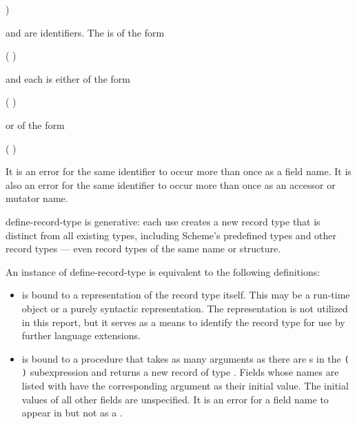 \begin{entry}{%
)}

\syntax
{} and  are identifiers.
The  is of the form
\begin{scheme}
(  \dotsfoo)%
\end{scheme}
and each  is either of the form
\begin{scheme}
( )%
\end{scheme}
or of the form
\begin{scheme}
(  )%
\end{scheme}

It is an error for the same identifier to occur more than once as a
field name.
It is also an error for the same identifier to occur more than once
as an accessor or mutator name.

{\cf define-record-type} is generative: each use creates a new record
type that is distinct from all existing types, including Scheme's
predefined types and other record types --- even record types of
the same name or structure.

An instance of {\cf define-record-type} is equivalent to the following
definitions:

\begin{itemize}

\item {} is bound to a representation of the record type itself.
This may be a run-time object or a purely syntactic representation.
The representation is not utilized in this report, but it serves as a
means to identify the record type for use by further language extensions.

\item {} is bound to a procedure that takes as
  many arguments as there are s in the
  \texttt{( \dotsfoo)} subexpression and returns a
  new record of type .  Fields whose names are listed with
   have the corresponding argument as their
  initial value.  The initial values of all other fields are
  unspecified.  It is an error for a field name to appear in
   but not as a .


\end{itemize}
\end{entry}
